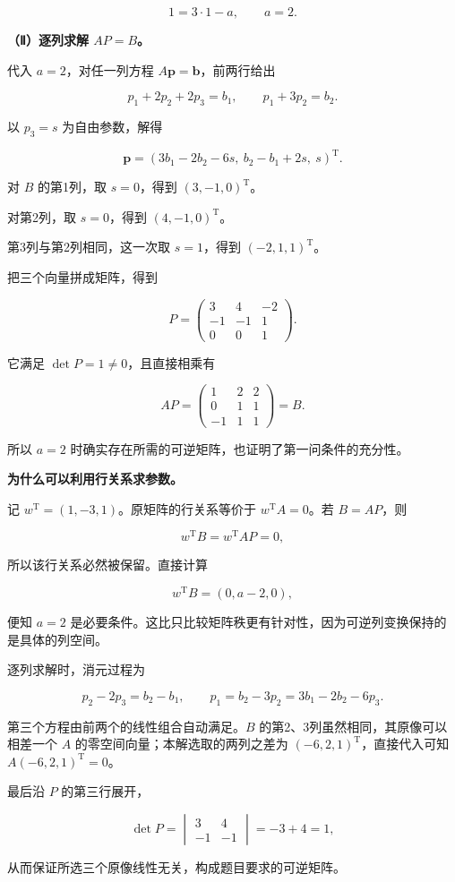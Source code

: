 \documentclass[UTF8,11pt,fontset=windows]{ctexart}
\begin{document}
$$
1=3\cdot1-a,
\qquad a=2.
$$

\textbf{（Ⅱ）逐列求解 $AP=B$。}

代入 $a=2$，对任一列方程 $A\boldsymbol p=\boldsymbol b$，前两行给出

$$
p_1+2p_2+2p_3=b_1,
\qquad p_1+3p_2=b_2.
$$

以 $p_3=s$ 为自由参数，解得

$$
\boldsymbol p=(3b_1-2b_2-6s,\ b_2-b_1+2s,\ s)^{\mathrm T}.
$$

对 $B$ 的第1列，取 $s=0$，得到 $(3,-1,0)^{\mathrm T}$。

对第2列，取 $s=0$，得到 $(4,-1,0)^{\mathrm T}$。

第3列与第2列相同，这一次取 $s=1$，得到 $(-2,1,1)^{\mathrm T}$。

把三个向量拼成矩阵，得到

$$
P=\begin{pmatrix}3&4&-2\\-1&-1&1\\0&0&1\end{pmatrix}.
$$

它满足 $\det P=1\ne0$，且直接相乘有

$$
AP=\begin{pmatrix}1&2&2\\0&1&1\\-1&1&1\end{pmatrix}=B.
$$

所以 $a=2$ 时确实存在所需的可逆矩阵，也证明了第一问条件的充分性。

\textbf{为什么可以利用行关系求参数。}

记 $w^{\mathrm T}=(1,-3,1)$。原矩阵的行关系等价于 $w^{\mathrm T}A=0$。若 $B=AP$，则

$$
w^{\mathrm T}B=w^{\mathrm T}AP=0,
$$

所以该行关系必然被保留。直接计算

$$
w^{\mathrm T}B=(0,a-2,0),
$$

便知 $a=2$ 是必要条件。这比只比较矩阵秩更有针对性，因为可逆列变换保持的是具体的列空间。

逐列求解时，消元过程为

$$
p_2-2p_3=b_2-b_1,
\qquad
p_1=b_2-3p_2=3b_1-2b_2-6p_3.
$$

第三个方程由前两个的线性组合自动满足。$B$ 的第2、3列虽然相同，其原像可以相差一个 $A$ 的零空间向量；本解选取的两列之差为 $(-6,2,1)^{\mathrm T}$，直接代入可知 $A(-6,2,1)^{\mathrm T}=0$。

最后沿 $P$ 的第三行展开，

$$
\det P=\begin{vmatrix}3&4\\-1&-1\end{vmatrix}=-3+4=1,
$$

从而保证所选三个原像线性无关，构成题目要求的可逆矩阵。
\end{document}

